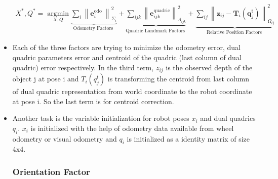 \documentclass[report.tex]{subfiles}
\begin{document}
\begin{itemize}
\begin{equation}
{
\begin{aligned}
X^{*}, Q^{*} =\underset{X, Q}{\operatorname{argmin}} \underbrace{\sum_{i}\left\|\mathbf{e}_{i}^{\text {odo }}\right\|_{\Sigma_{i}}^{2}}_{\text {Odometry Factors }}+\underbrace{\sum_{i j k}\left\|\mathbf{e}_{i j k}^{\mathrm{quadric}}\right\|_{\Lambda_{i j k}}^{2}}_{\text {Quadric Landmark Factors }}+\underbrace{\sum_{i j}\left\|\mathbf{z}_{i j}-\mathbf{T}_{i}\left(\mathbf{q}_{j}^{\mathrm{t}}\right)\right\|_{\Omega_{i j}}^{2}}_{\text {Relative Position Factors }}
\end{aligned}
}
\end{equation}
\item Each of the three factors are trying to minimize the odometry error, dual quadric parameters error and centroid of the quadric (last column of dual quadric) error respectively. In the third term, $z_{ij}$ is the observed depth of the object j at pose i and $T_i(q_{j}^{t})$ is transforming the centroid from last column of dual quadric representation from world coordinate to the robot coordinate at pose i. So the last term is for centroid correction.

\item Another task is the variable initialization for robot poses $x_i$ and dual quadrics $q_i$. $x_i$ is initialized with the help of odometry data available from wheel odometry or visual odometry and $q_i$ is initialized as a identity matrix of size 4x4.

\subsubsection{Orientation Factor}


\end{itemize}
\end{document}
